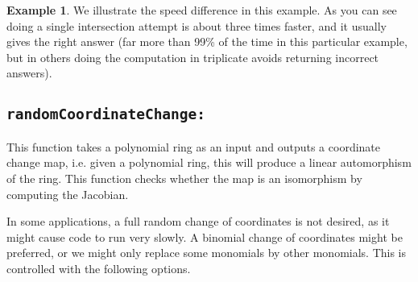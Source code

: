 \documentclass[11pt]{amsart}
\theoremstyle{definition}
\newtheorem{example}{Example}[section]
\begin{document}
\begin{example} We illustrate the speed difference in this example.
	{}
As you can see doing a single intersection attempt is about three times faster, and it usually gives the right answer (far more than 99\% of the time in this particular example, but in others doing the computation in triplicate avoids returning incorrect answers).
\end{example}


\subsection{\tt randomCoordinateChange:} 
\label{subSec.randomCoordinateChange}

This function takes a polynomial ring as an input and outputs a coordinate change map,
i.e. given a polynomial ring, this will produce a linear automorphism of the ring.  This function checks whether the map is an isomorphism by computing the Jacobian.

In some applications, a full random change of coordinates is not desired, as it might cause code to run very slowly.  A binomial change of coordinates might be preferred, or we might only replace some monomials by other monomials.  
This is controlled with the following options.
\end{document}
